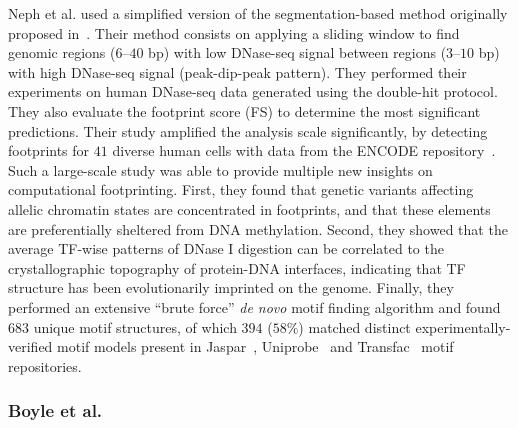 Neph et al.\cite{neph2012a} used a simplified version of the segmentation-based method originally proposed in~\cite{hesselberth2009}. Their method consists on applying a sliding window to find genomic regions ($6$--$40$ bp) with low DNase-seq signal between regions ($3$--$10$ bp) with high DNase-seq signal (peak-dip-peak pattern). They performed their experiments on human DNase-seq data generated using the double-hit protocol. They also evaluate the footprint score (FS) to determine the most significant predictions. Their study amplified the analysis scale significantly, by detecting footprints for $41$ diverse human cells with data from the ENCODE repository~\cite{encode2012}. Such a large-scale study was able to provide multiple new insights on computational footprinting. First, they found that genetic variants affecting allelic chromatin states are concentrated in footprints, and that these elements are preferentially sheltered from DNA methylation. Second, they showed that the average TF-wise patterns of DNase I digestion can be correlated to the crystallographic topography of protein-DNA interfaces, indicating that TF structure has been evolutionarily imprinted on the genome. Finally, they performed an extensive ``brute force'' \emph{de novo} motif finding algorithm and found $683$ unique motif structures, of which $394$ ($58\%$) matched distinct experimentally-verified motif models present in Jaspar~\cite{mathelier2014}, Uniprobe~\cite{robasky2011} and Transfac~\cite{matys2006} motif repositories.

\subsubsection{Boyle et al.}
\label{sec:boyle.2}

